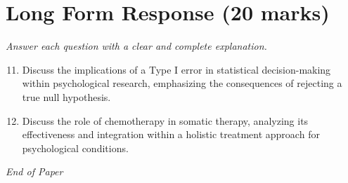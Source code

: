 \documentclass[12pt]{article}
\begin{document}
\section*{Long Form Response (20 marks)}
\textit{Answer each question with a clear and complete explanation.}
\begin{enumerate}[label=\arabic*.]
\setcounter{enumi}{10}
\item Discuss the implications of a Type I error in statistical decision-making within psychological research, emphasizing the consequences of rejecting a true null hypothesis.
\item Discuss the role of chemotherapy in somatic therapy, analyzing its effectiveness and integration within a holistic treatment approach for psychological conditions.
\end{enumerate}

\vfill
\noindent\textit{End of Paper}
\end{document}
